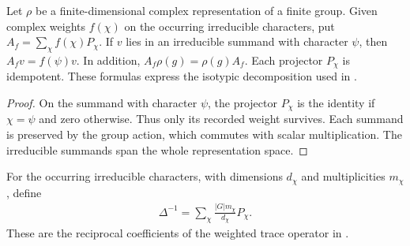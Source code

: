 \begin{lemma}
    \label{thm:peps_weighted_character_projectors}
    \leanok
    Let $\rho$ be a finite-dimensional complex representation of a finite
    group. Given complex weights $f(\chi)$ on the occurring irreducible
    characters, put $A_f=\sum_\chi f(\chi)P_\chi$.
    If $v$ lies in an irreducible summand with character $\psi$, then
    $A_fv=f(\psi)v$. In addition, $A_f\rho(g)=\rho(g)A_f$.
    Each projector $P_\chi$ is idempotent.
    These formulas express the isotypic decomposition used in
    \cite[Lemma~4.4]{Schuch2010PEPS}.
\end{lemma}
\begin{proof}\leanok
    On the summand with character $\psi$, the projector $P_\chi$ is the
    identity if $\chi=\psi$ and zero otherwise. Thus only its recorded
    weight survives. Each summand is preserved by the group action,
    which commutes with scalar multiplication. The irreducible summands
    span the whole representation space.
\end{proof}

\begin{definition}
    \label{def:peps_delta_inverse}
    \leanok
    For the occurring irreducible characters, with dimensions $d_\chi$
    and multiplicities $m_\chi$, define
    \begin{align}
        \Delta^{-1}=\sum_\chi\frac{|G|m_\chi}{d_\chi}P_\chi.
        \label{eq:peps_delta_inverse}
    \end{align}
    These are the reciprocal coefficients of the weighted trace operator
    in \cite[Lemma~4.4]{Schuch2010PEPS}.
\end{definition}

